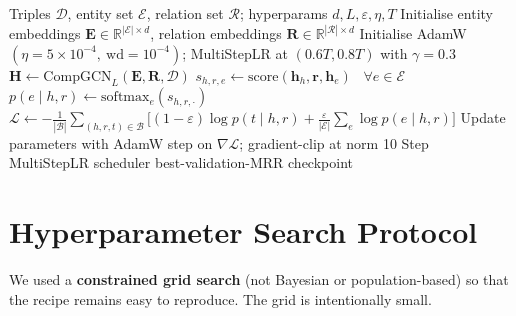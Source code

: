 \begin{algorithm}[h]
\caption{\ours\ (Recipe-Controlled) training recipe. All italicised quantities are dataset-independent hyperparameters; brackets give the grid we searched.}
\label{alg:recipe}
\begin{algorithmic}[1]
\Require Triples $\mathcal{D}$, entity set $\mathcal{E}$, relation set $\mathcal{R}$; hyperparams $d, L, \varepsilon, \eta, T$
\State Initialise entity embeddings $\mathbf{E} \in \mathbb{R}^{|\mathcal{E}| \times d}$, relation embeddings $\mathbf{R} \in \mathbb{R}^{|\mathcal{R}| \times d}$
\State Initialise AdamW$(\eta{=}5\!\times\!10^{-4},\ \text{wd}{=}10^{-4})$; MultiStepLR at $(0.6T, 0.8T)$ with $\gamma{=}0.3$
        \State $\mathbf{H} \gets \mathrm{CompGCN}_L(\mathbf{E}, \mathbf{R}, \mathcal{D})$ 
        \State $s_{h,r,e} \gets \mathrm{score}(\mathbf{h}_h, \mathbf{r}, \mathbf{h}_e)$ \ $\forall e \in \mathcal{E}$ 
        \State $p(e \mid h, r) \gets \mathrm{softmax}_e(s_{h,r,\cdot})$
        \State $\mathcal{L} \gets -\tfrac{1}{|\mathcal{B}|}\sum_{(h,r,t)\in\mathcal{B}}\Big[(1{-}\varepsilon)\log p(t\mid h,r) + \tfrac{\varepsilon}{|\mathcal{E}|}\sum_e \log p(e\mid h,r)\Big]$ 
        \State Update parameters with AdamW step on $\nabla\mathcal{L}$; gradient-clip at norm 10
    \EndFor
    \State Step MultiStepLR scheduler
\EndFor
\State \Return best-validation-MRR checkpoint
\end{algorithmic}
\end{algorithm}

\section{Hyperparameter Search Protocol}
\label{app:hp-search}

We used a \textbf{constrained grid search} (not Bayesian or population-based) so that the recipe remains easy to reproduce. The grid is intentionally small.

